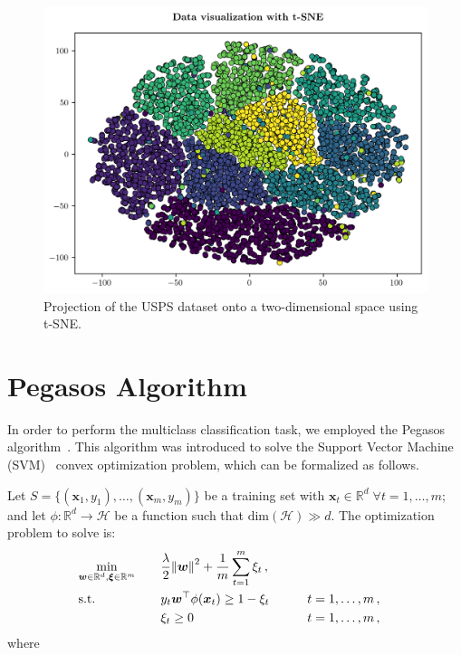 \documentclass[runningheads]{llncs}
\begin{document}
\begin{figure}
  \center
  \includegraphics[width=1\textwidth]{../img/tsne.png}
  \caption{Projection of the USPS dataset onto a two-dimensional space using t-SNE.} 
  \label{fig:dataset:tsne}
\end{figure}

\section{Pegasos Algorithm}
\label{sec:algorithm}

In order to perform the multiclass classification task, we employed the Pegasos algorithm~\cite{shalev-pegasos-2011}. This algorithm was introduced to solve the Support Vector Machine (SVM)~\cite{vapnik-1999-statistical-learning} convex optimization problem, which can be formalized as follows. 

Let $S = \{(\bm{x}_1,y_1),\dots,(\bm{x}_m,y_m)\}$ be a training set with $\bm{x}_t \in \mathbb{R}^d \; \forall t=1,\dots,m$; and let $\phi : \mathbb{R}^d \to \mathcal{H}$ be a function such that $\text{dim}(\mathcal{H}) \gg d$. The optimization problem to solve is: 
\begin{alignat}{3}
  &\!\min_{\bm{w} \in \mathbb{R}^d, \bm{\xi} \in \mathbb{R}^m} & \quad & \frac{\lambda}{2} \norm{\bm{w}}^2 + \frac{1}{m}\sum_{t=1}^{m} \xi_t \, , \label{eqn:svm}\\
  &\text{s.t.}  &       & y_t \bm{w}^\top \phi(\bm{x}_t) \geq 1 - \xi_t &\qquad& t = 1,\dots,m \, , \notag\\
  &                   &       & \xi_t \geq 0  &\qquad& t = 1,\dots,m \, , \notag
\end{alignat}
where
\end{document}
